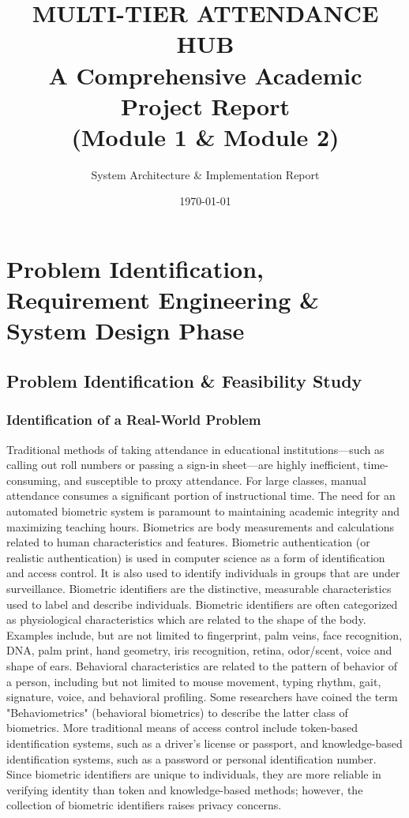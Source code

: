 \documentclass[12pt,a4paper]{report}
\title{
    \vspace{2cm}
    \Huge \textbf{MULTI-TIER ATTENDANCE HUB} \\
    \vspace{1cm}
    \Large A Comprehensive Academic Project Report \\
    \vspace{0.5cm}
    \large (Module 1 \& Module 2)
}
\author{System Architecture \& Implementation Report}
\date{\today}
\begin{document}
\maketitle
\tableofcontents
\newpage

\chapter{Problem Identification, Requirement Engineering \& System Design Phase}

\section{Problem Identification \& Feasibility Study}

\subsection{Identification of a Real-World Problem}
Traditional methods of taking attendance in educational institutions—such as calling out roll numbers or passing a sign-in sheet—are highly inefficient, time-consuming, and susceptible to proxy attendance. For large classes, manual attendance consumes a significant portion of instructional time. The need for an automated biometric system is paramount to maintaining academic integrity and maximizing teaching hours.
Biometrics are body measurements and calculations related to human characteristics and features. Biometric authentication (or realistic authentication) is used in computer science as a form of identification and access control. It is also used to identify individuals in groups that are under surveillance.
Biometric identifiers are the distinctive, measurable characteristics used to label and describe individuals. Biometric identifiers are often categorized as physiological characteristics which are related to the shape of the body. Examples include, but are not limited to fingerprint, palm veins, face recognition, DNA, palm print, hand geometry, iris recognition, retina, odor/scent, voice and shape of ears. Behavioral characteristics are related to the pattern of behavior of a person, including but not limited to mouse movement, typing rhythm, gait, signature, voice, and behavioral profiling. Some researchers have coined the term "Behaviometrics" (behavioral biometrics) to describe the latter class of biometrics.
More traditional means of access control include token-based identification systems, such as a driver's license or passport, and knowledge-based identification systems, such as a password or personal identification number. Since biometric identifiers are unique to individuals, they are more reliable in verifying identity than token and knowledge-based methods; however, the collection of biometric identifiers raises privacy concerns. 
\end{document}
